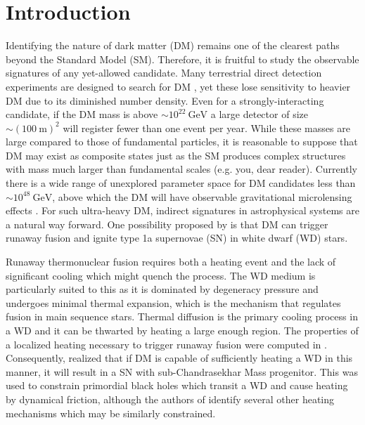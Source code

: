 \documentclass[twocolumn, preprintnumbers,amsmath,amssymb,prd, superscriptaddress]{revtex4}
\newcommand{\GeV}{\text{GeV}}
\begin{document}
\section{Introduction}
\label{sec:Introduction}

Identifying the nature of dark matter (DM) remains one of the clearest paths beyond the Standard Model (SM).
Therefore, it is fruitful to study the observable signatures of any yet-allowed candidate.
Many terrestrial direct detection experiments are designed to search for DM \cite{Akerib:2016vxi, Agnese:2017njq}, yet these lose sensitivity to heavier DM due to its diminished number density.
Even for a strongly-interacting candidate, if the DM mass is above $\sim 10^{22} ~\GeV$ a large detector of size $\sim (100 ~\text{m})^2$ will register fewer than one event per year.
While these masses are large compared to those of fundamental particles, it is reasonable to suppose that DM may exist as composite states just as the SM produces complex structures with mass much larger than fundamental scales (e.g. you, dear reader).
Currently there is a wide range of unexplored parameter space for DM candidates less than $\sim 10^{48} ~\GeV$, above which the DM will have observable gravitational microlensing effects \cite{Griest:2013aaa}.
For such ultra-heavy DM, indirect signatures in astrophysical systems are a natural way forward.
One possibility proposed by \cite{Graham:2015apa} is that DM can trigger runaway fusion and ignite type 1a supernovae (SN) in white dwarf (WD) stars.

Runaway thermonuclear fusion requires both a heating event and the lack of significant cooling which might quench the process.
The WD medium is particularly suited to this as it is dominated by degeneracy pressure and undergoes minimal thermal expansion, which is the mechanism that regulates fusion in main sequence stars.
Thermal diffusion is the primary cooling process in a WD and it can be thwarted by heating a large enough region.
The properties of a localized heating necessary to trigger runaway fusion were computed in \cite{Woosley}.
Consequently, \cite{Graham:2015apa} realized that if DM is capable of sufficiently heating a WD in this manner, it will result in a SN with sub-Chandrasekhar Mass progenitor.
This was used to constrain primordial black holes which transit a WD and cause heating by dynamical friction, although the authors of \cite{Graham:2015apa} identify several other heating mechanisms which may be similarly constrained.
\end{document}
